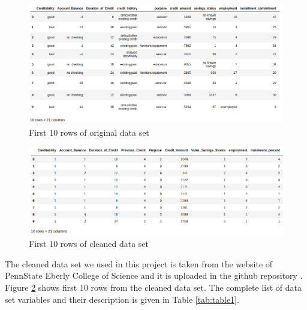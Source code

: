 \documentclass[sigconf]{acmart}
\begin{document}
\begin{figure}[htb]
  \centering
  \includegraphics[width=1.0\columnwidth]{project/images/Figure2.png}
  \caption{First 10 rows of original data set
  \cite{github}}
  \label{fig:Figure2} 
\end{figure}

\begin{figure}[htb]
  \centering
  \includegraphics[width=1.0\columnwidth]{project/images/Figure3.png}
  \caption{First 10 rows of cleaned data set
  \cite{psu-site}}
  \label{fig:Figure3} 
\end{figure}

The cleaned data set we used in this project is taken from the website of PennState Eberly College of Science \cite{psu-site} and it is uploaded in the github repository \cite{github}. Figure \ref{fig:Figure3} shows first 10 rows from the cleaned data set. The complete list of data set variables and their description is given in Table \ref{tab:table1}. 
\end{document}
